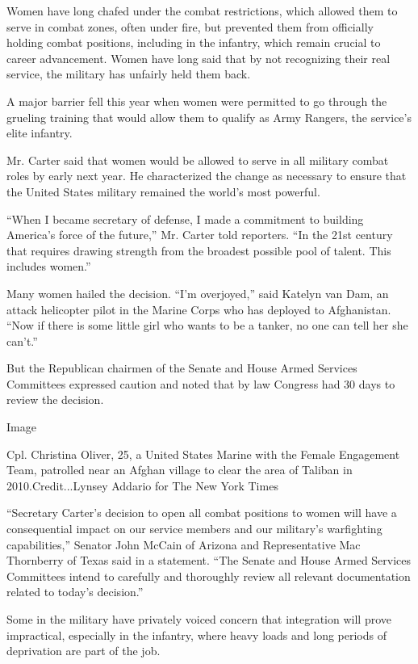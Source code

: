 Women have long chafed under the combat restrictions, which allowed them
to serve in combat zones, often under fire, but prevented them from
officially holding combat positions, including in the infantry, which
remain crucial to career advancement. Women have long said that by not
recognizing their real service, the military has unfairly held them
back.

A major barrier fell this year when women were permitted to go through
the grueling training that would allow them to qualify as Army Rangers,
the service's elite infantry.

Mr. Carter said that women would be allowed to serve in all military
combat roles by early next year. He characterized the change as
necessary to ensure that the United States military remained the world's
most powerful.

``When I became secretary of defense, I made a commitment to building
America's force of the future,'' Mr. Carter told reporters. ``In the
21st century that requires drawing strength from the broadest possible
pool of talent. This includes women.''

Many women hailed the decision. ``I'm overjoyed,'' said Katelyn van Dam,
an attack helicopter pilot in the Marine Corps who has deployed to
Afghanistan. ``Now if there is some little girl who wants to be a
tanker, no one can tell her she can't.''

But the Republican chairmen of the Senate and House Armed Services
Committees expressed caution and noted that by law Congress had 30 days
to review the decision.

Image

Cpl. Christina Oliver, 25, a United States Marine with the Female
Engagement Team, patrolled near an Afghan village to clear the area of
Taliban in 2010.Credit...Lynsey Addario for The New York Times

``Secretary Carter's decision to open all combat positions to women will
have a consequential impact on our service members and our military's
warfighting capabilities,'' Senator John McCain of Arizona and
Representative Mac Thornberry of Texas said in a statement. ``The Senate
and House Armed Services Committees intend to carefully and thoroughly
review all relevant documentation related to today's decision.''

Some in the military have privately voiced concern that integration will
prove impractical, especially in the infantry, where heavy loads and
long periods of deprivation are part of the job.

